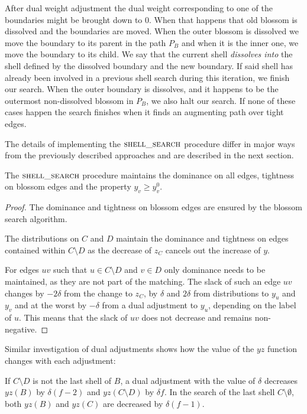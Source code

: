 After dual weight adjustment the dual weight corresponding to one of the boundaries might be brought down to $0$. When that happens that old blossom is dissolved and the boundaries are moved. When the outer blossom is dissolved we move the boundary to its parent in the path $P_B$ and when it is the inner one, we move the boundary to its child. We say that the current shell \textit{dissolves into} the shell defined by the dissolved boundary and the new boundary. If said shell has already been involved in a previous shell search during this iteration, we finish our search. When the outer boundary is dissolves, and it happens to be the outermost non-dissolved blossom in $P_B$, we also halt our search. If none of these cases happen the search finishes when it finds an augmenting path over tight edges.

The details of implementing the $\textsc{shell\_search}$ procedure differ in major ways from the previously described approaches and are described in the next section.

\begin{lemma}\label{lem:search_correctness}
    The $\textsc{shell\_search}$ procedure maintains the dominance on all edges, tightness on blossom edges and the property $y_v \geq y^0_v$.
\end{lemma}

\begin{proof}
    The dominance and tightness on blossom edges are ensured by the blossom search algorithm. 
    
    The distributions on $C$ and $D$ maintain the dominance and tightness on edges contained within $C \setminus D$ as the decrease of $z_C$ cancels out the increase of $y$. 
    
    For edges $uv$ such that $u \in C \setminus D$ and $v \in D$ only dominance needs to be maintained, as they are not part of the matching. The slack of such an edge $uv$ changes by $-2\delta$ from the change to $z_C$, by $\delta$ and $2\delta$ from distributions to $y_u$ and $y_v$ and at the worst by $-\delta$ from a dual adjustment to $y_u$, depending on the label of $u$. This means that the slack of $uv$ does not decrease and remains non-negative.
\end{proof}

Similar investigation of dual adjustments shows how the value of the $yz$ function changes with each adjustment:

\begin{lemma}\label{lem:search_duals}
    If $C \setminus D$ is not the last shell of $B$, a dual adjustment with the value of $\delta$ decreases $yz(B)$ by $\delta(f-2)$ and $yz(C \setminus D)$ by $\delta f$. In the search of the last shell $C \setminus \emptyset$, both $yz(B)$ and $yz(C)$ are decreased by $\delta(f-1)$.
\end{lemma}

